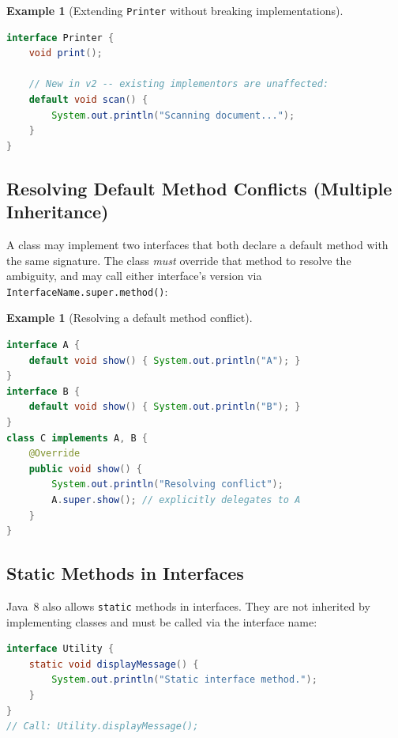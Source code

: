 \documentclass[11pt, a4paper, notitlepage]{report}
\theoremstyle{definition}
\theoremstyle{remark}
\theoremstyle{definition}
\newtheorem{example}[theorem]{Example}
\begin{document}
\begin{example}[Extending \texttt{Printer} without breaking implementations]
\leavevmode
\begin{lstlisting}[language=Java]
interface Printer {
    void print();

    // New in v2 -- existing implementors are unaffected:
    default void scan() {
        System.out.println("Scanning document...");
    }
}
\end{lstlisting}
\end{example}

\subsection{Resolving Default Method Conflicts (Multiple Inheritance)}
\label{subsec:ch10-default-conflict}

A class may implement two interfaces that both declare a default method with the same
signature.  The class \emph{must} override that method to resolve the ambiguity, and
may call either interface's version via \texttt{InterfaceName.super.method()}:

\begin{example}[Resolving a default method conflict]
\leavevmode
\begin{lstlisting}[language=Java]
interface A {
    default void show() { System.out.println("A"); }
}
interface B {
    default void show() { System.out.println("B"); }
}
class C implements A, B {
    @Override
    public void show() {
        System.out.println("Resolving conflict");
        A.super.show(); // explicitly delegates to A
    }
}
\end{lstlisting}
\end{example}

\subsection{Static Methods in Interfaces}
\label{subsec:ch10-static-interface}

Java~8 also allows \texttt{static} methods in interfaces.  They are not inherited by
implementing classes and must be called via the interface name:

\begin{lstlisting}[language=Java]
interface Utility {
    static void displayMessage() {
        System.out.println("Static interface method.");
    }
}
// Call: Utility.displayMessage();
\end{lstlisting}
\end{document}
